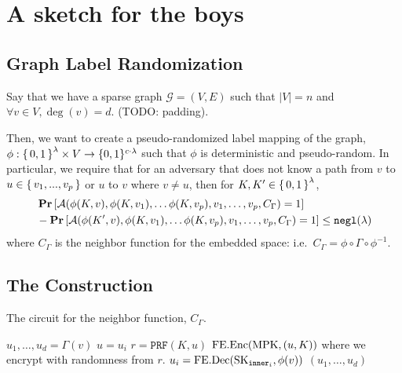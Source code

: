 \section{A sketch for the boys}
\newcommand{\graph}{\mathcal{G}}
\newcommand{\verts}{V}
\newcommand{\inner}{\texttt{inner}}
\newcommand{\edges}{E}
\newcommand{\maxDeg}{d}
\newcommand{\nVerts}{n}
\newcommand{\embedFn}{\phi}
\newcommand{\idealEmbedFn}{\Phi}
\newcommand{\circNeigb}{C_\Gamma}
\newcommand{\PRF}{\texttt{PRF}}
\newcommand{\Hyb}{\texttt{Hyb}}
\newcommand{\adversB}{\mathcal{B}}

\newcommand{\minEntropy}{I_\texttt{min}}

\subsection{Graph Label Randomization}
Say that we have a sparse graph $\graph = (\verts, \edges)$ such that $|\verts| = n$
and $\forall v \in \verts, \deg(v) = d$. (TODO: padding).

Then, we want to create a pseudo-randomized label mapping of the graph, $\embedFn: \set{0, 1}^\lambda \times \verts \rightarrow \{0, 1\}^{c \cdot \lambda}$
such that $\embedFn$ is deterministic and pseudo-random. In particular, we require that for an adversary 
that does not know a path from $v$ to $u \in \set{v_1, ..., v_p}$ or $u$ to $v$ where $v \neq u$, then for $K, K' \in \set{0, 1}^\lambda$,
\begin{align}
	&\Pr\left[\advers(\embedFn(K, v), \embedFn(K, v_1), \dots \embedFn(K, v_{p}), v_1, \dots, v_p, \circNeigb) = 1\right]
	\label{eq:gameGRO}
	\\
	&- \Pr\left[\advers(\embedFn(K', v), \embedFn(K, v_1), \dots \embedFn(K, v_{p}), v_1, \dots, v_p, \circNeigb) = 1\right]
		\leq \negl(\lambda) \notag
\end{align}
where $\circNeigb$ is the neighbor function for the embedded space: i.e.\ $\circNeigb = \embedFn \circ \Gamma \circ \embedFn^{-1}$.

\subsection{The Construction}
\begin{algorithm}[H]
	\caption{
		The circuit for the neighbor function, $\circNeigb$.
	}
	\begin{algorithmic}[1]
		\Function{$\inner_i$}{$\Dec(\phi(v)) = v, K$}
			\State $u_1, \dots, u_d = \Gamma(v)$
			\State $u = u_i$
			\State $r = \PRF(K, u)$
			\State \Return $\text{FE.Enc}(\text{MPK}, (u, K))$ where we encrypt with randomness from $r$.
		\EndFunction
		\Function{$\circNeigb$}{$\phi(v)$}
				\State $u_i = \text{FE.Dec}(\text{SK}_{\texttt{inner}_i}, \phi(v))$
			\EndFor
			\State \Return $(u_1, \dots, u_d)$
		\EndFunction
	\end{algorithmic}
	\label{alg:neighb}
\end{algorithm}

